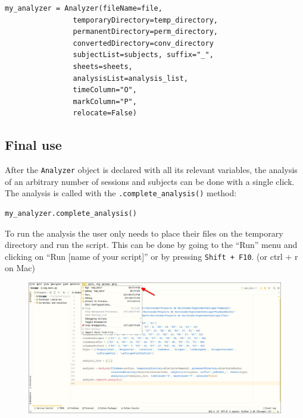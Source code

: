 \documentclass[a4paper,12pt]{article}
\begin{document}
\begin{tcolorbox}[
    enhanced,
    attach boxed title to top left={xshift=6mm,yshift=-3mm},
    colback=lightgreen!20,
    colframe=lightgreen,
    colbacktitle=lightgreen,
    title=Python,
    fonttitle=\bfseries\color{black},
    boxed title style={size=small,colframe=lightgreen,sharp corners},
    sharp corners,
    ]
    \begin{verbatim}
my_analyzer = Analyzer(fileName=file,
                temporaryDirectory=temp_directory,
                permanentDirectory=perm_directory,
                convertedDirectory=conv_directory
                subjectList=subjects, suffix="_",
                sheets=sheets,
                analysisList=analysis_list,
                timeColumn="O",
                markColumn="P",
                relocate=False)
    \end{verbatim}
\end{tcolorbox}

\subsection{Final use}

After the \verb|Analyzer| object is declared with all its relevant variables, the analysis of an arbitrary number of sessions and subjects can be done with a single click.  The analysis is called with the \verb|.complete_analysis()| method:
\begin{tcolorbox}[
    enhanced,
    attach boxed title to top left={xshift=6mm,yshift=-3mm},
    colback=lightgreen!20,
    colframe=lightgreen,
    colbacktitle=lightgreen,
    title=Python,
    fonttitle=\bfseries\color{black},
    boxed title style={size=small,colframe=lightgreen,sharp corners},
    sharp corners,
    ]
    \begin{verbatim}
my_analyzer.complete_analysis()
    \end{verbatim}
\end{tcolorbox}

To run the analysis the user only needs to place their files on the temporary directory and run the script. This can be done by going to the ``Run'' menu and clicking on ``Run [name of your script]'' or by pressing \verb|Shift + F10|. (or ctrl + r on Mac)

\begin{figure}[!ht]
    \begin{center}
        \includegraphics[scale=0.35]{pycharm-run.png}
    \end{center}
\end{figure}
\end{document}
